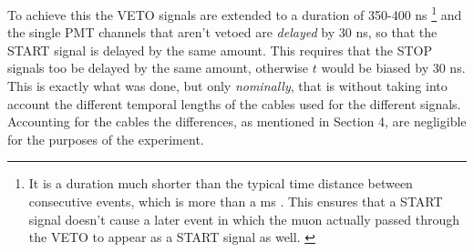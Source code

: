 \documentclass[10pt,a4paper,twocolumn]{article}
\begin{document}
To achieve this the VETO signals are extended to a duration of 350-400 ns \footnote{It is a duration much shorter than the typical time distance between consecutive events, which is more than a ms . This ensures that a START signal doesn't cause a later event in which the muon actually passed through the VETO to appear as a START signal as well. \label{foottimedist}} and the single PMT channels that aren't vetoed are \textit{delayed} by 30 ns, so that the START signal is delayed by the same amount. This requires that the STOP signals too be delayed by the same amount, otherwise $t$ would be biased by 30 ns. This is exactly what was done, but only \textit{nominally}, that is without taking into account the different temporal lengths of the cables used for the different signals. Accounting for the cables the differences, as mentioned in Section 4, are negligible for the purposes of the experiment.
\end{document}
